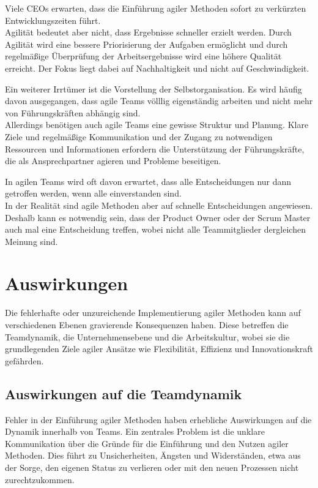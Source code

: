 \documentclass[ngerman]{seminarvorlage}
\begin{document}
Viele CEOs erwarten, dass die Einführung agiler Methoden sofort zu verkürzten Entwicklungszeiten führt.\\
Agilität bedeutet aber nicht, dass Ergebnisse schneller erzielt werden. Durch Agilität wird eine bessere Priorisierung der Aufgaben ermöglicht und durch regelmäßige Überprüfung der Arbeitsergebnisse wird eine höhere Qualität erreicht. Der Fokus liegt dabei auf Nachhaltigkeit und nicht auf Geschwindigkeit.

Ein weiterer Irrtümer ist die Vorstellung der Selbstorganisation. Es wird häufig davon ausgegangen, dass agile Teams völllig eigenständig arbeiten und nicht mehr von Führungskräften abhängig sind.\\
Allerdings benötigen auch agile Teams eine gewisse Struktur und Planung. Klare Ziele und regelmäßige Kommunikation und der Zugang zu notwendigen Ressourcen und Informationen erfordern die Unterstützung der Führungskräfte, die als Ansprechpartner agieren und Probleme beseitigen.

In agilen Teams wird oft davon erwartet, dass alle Entscheidungen nur dann getroffen werden, wenn alle einverstanden sind.\\
In der Realität sind agile Methoden aber auf schnelle Entscheidungen angewiesen. Deshalb kann es notwendig sein, dass der Product Owner oder der Scrum Master auch mal eine Entscheidung treffen, wobei nicht alle Teammitglieder dergleichen Meinung sind.


\section{Auswirkungen}
Die fehlerhafte oder unzureichende Implementierung agiler Methoden kann auf verschiedenen Ebenen gravierende Konsequenzen haben. Diese betreffen die Teamdynamik, die Unternehmensebene und die Arbeitskultur, wobei sie die grundlegenden Ziele agiler Ansätze wie Flexibilität, Effizienz und Innovationskraft gefährden.

\subsection{Auswirkungen auf die Teamdynamik}
Fehler in der Einführung agiler Methoden haben erhebliche Auswirkungen auf die Dynamik innerhalb von Teams. Ein zentrales Problem ist die unklare Kommunikation über die Gründe für die Einführung und den Nutzen agiler Methoden. Dies führt zu Unsicherheiten, Ängsten und Widerständen, etwa aus der Sorge, den eigenen Status zu verlieren oder mit den neuen Prozessen nicht zurechtzukommen.
\end{document}
